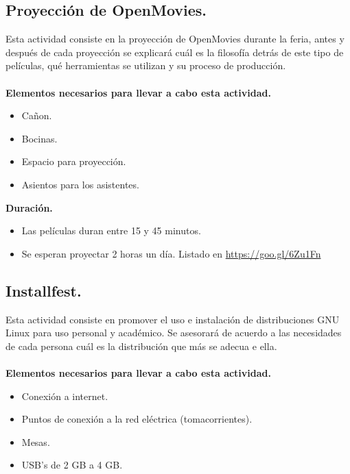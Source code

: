 \documentclass[a4paper,11pt]{article}                 %
\begin{document}
  \subsection{Proyección de OpenMovies.}                                     %
  
  Esta actividad consiste en la proyección de OpenMovies durante la feria, antes y después de cada proyección se explicará cuál es la filosofía detrás de este tipo de películas, qué herramientas se utilizan y su proceso de producción.
  \paragraph{}
 \textbf{Elementos necesarios para llevar a cabo esta actividad.}
  \begin{itemize}
    \label{list:openmovies}
    \item Cañon.
    \item Bocinas.
    \item Espacio para proyección.
    \item Asientos para los asistentes.
  \end{itemize}
  
  \textbf{Duración.}
  \begin{itemize}
    \item Las películas duran entre 15 y 45 minutos.
    \item Se esperan proyectar 2 horas un día. Listado en 
    \url{https://goo.gl/6Zu1Fn}
  \end{itemize}
  
  
    \subsection{Installfest.}                                     %
    Esta actividad consiste en promover el uso e instalación de distribuciones GNU Linux para uso personal y académico. Se asesorará de acuerdo a las necesidades de cada persona cuál es la distribución que más se adecua e ella.
  \paragraph{}
   \textbf{Elementos necesarios para llevar a cabo esta actividad.}
  \begin{itemize}
    \label{list:installfest}
    \item Conexión a internet.
    \item Puntos de conexión a la red eléctrica (tomacorrientes).
    \item Mesas.
    \item USB's de 2 GB a 4 GB.
  \end{itemize}
  
\end{document}
